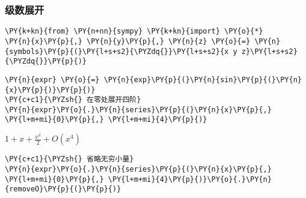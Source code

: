     \hypertarget{ux7ea7ux6570ux5c55ux5f00}{%
\subsubsection{级数展开}\label{ux7ea7ux6570ux5c55ux5f00}}

    \begin{tcolorbox}[breakable, size=fbox, boxrule=1pt, pad at break*=1mm,colback=cellbackground, colframe=cellborder]
\begin{Verbatim}[commandchars=\\\{\}]
\PY{k+kn}{from} \PY{n+nn}{sympy} \PY{k+kn}{import} \PY{o}{*}
\PY{n}{x}\PY{p}{,} \PY{n}{y}\PY{p}{,} \PY{n}{z} \PY{o}{=} \PY{n}{symbols}\PY{p}{(}\PY{l+s+s2}{\PYZdq{}}\PY{l+s+s2}{x y z}\PY{l+s+s2}{\PYZdq{}}\PY{p}{)}
\end{Verbatim}
\end{tcolorbox}

    \begin{tcolorbox}[breakable, size=fbox, boxrule=1pt, pad at break*=1mm,colback=cellbackground, colframe=cellborder]
\begin{Verbatim}[commandchars=\\\{\}]
\PY{n}{expr} \PY{o}{=} \PY{n}{exp}\PY{p}{(}\PY{n}{sin}\PY{p}{(}\PY{n}{x}\PY{p}{)}\PY{p}{)}
\PY{c+c1}{\PYZsh{} 在零处展开四阶}
\PY{n}{expr}\PY{o}{.}\PY{n}{series}\PY{p}{(}\PY{n}{x}\PY{p}{,} \PY{l+m+mi}{0}\PY{p}{,} \PY{l+m+mi}{4}\PY{p}{)}
\end{Verbatim}
\end{tcolorbox}
 
            
    
    $\displaystyle 1 + x + \frac{x^{2}}{2} + O\left(x^{4}\right)$

    

    \begin{tcolorbox}[breakable, size=fbox, boxrule=1pt, pad at break*=1mm,colback=cellbackground, colframe=cellborder]
\begin{Verbatim}[commandchars=\\\{\}]
\PY{c+c1}{\PYZsh{} 省略无穷小量}
\PY{n}{expr}\PY{o}{.}\PY{n}{series}\PY{p}{(}\PY{n}{x}\PY{p}{,} \PY{l+m+mi}{0}\PY{p}{,} \PY{l+m+mi}{4}\PY{p}{)}\PY{o}{.}\PY{n}{removeO}\PY{p}{(}\PY{p}{)}
\end{Verbatim}
\end{tcolorbox}
 
            
    
